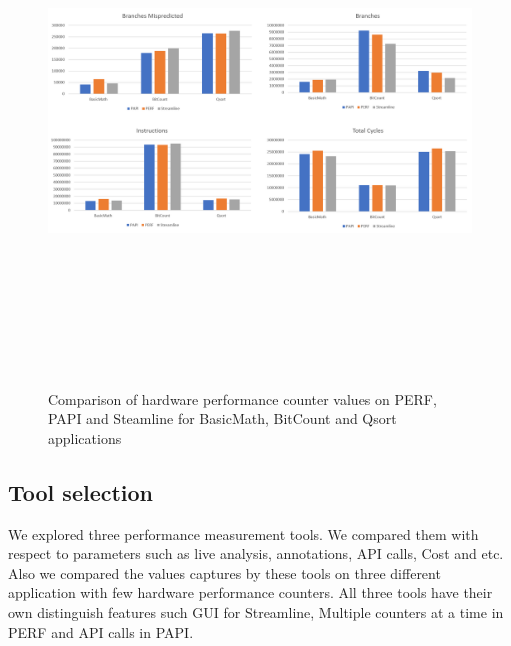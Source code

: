 \begin{figure}[h!]
\includegraphics[width=14cm, height=14cm]{./images/tool_result}
\centering
\caption{Comparison of hardware performance counter values on PERF, PAPI and Steamline for BasicMath, BitCount and Qsort applications}
\label{fig:tool_results}
\end{figure}

\subsection{Tool selection}

We explored three performance measurement tools. We compared them with respect to parameters such as live analysis, annotations, API calls, Cost and etc. Also we compared the values captures by these tools on three different application with few hardware performance counters. All three tools have their own distinguish features such GUI for Streamline, Multiple counters at a time in PERF and API calls in PAPI. 

